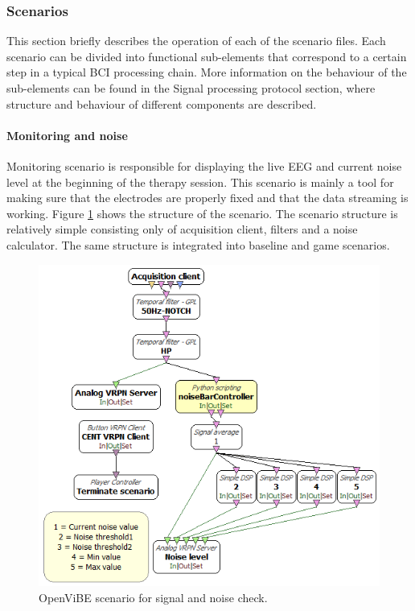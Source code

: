 \subsubsection{Scenarios}
This section briefly describes the operation of each of the scenario files. Each scenario can be divided into functional sub-elements that correspond to a certain step in a typical BCI processing chain. More information on the behaviour of the sub-elements can be found in the Signal processing protocol section, where structure and behaviour of different components are described.

\paragraph{Monitoring and noise}
Monitoring scenario is responsible for displaying the live EEG and current noise level at the beginning of the therapy session. This scenario is mainly a tool for making sure that the electrodes are properly fixed and that the data streaming is working. Figure \ref{monitoringnoise} shows the structure of the scenario. The scenario structure is relatively simple consisting only of acquisition client, filters and a noise calculator. The same structure is integrated into baseline and game scenarios.

\begin{figure}[h]
	\centering
	\includegraphics[scale=0.4]{noise.png}
	\caption{OpenViBE scenario for signal and noise check.}\label{monitoringnoise}
\end{figure}  

